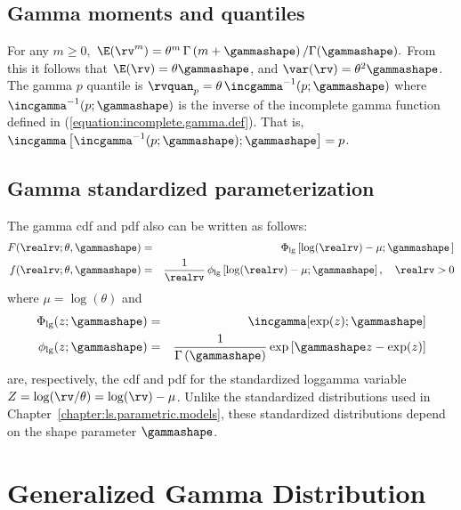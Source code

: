\subsection{Gamma moments and quantiles}
\label{section:gamma.moment.quant}
For any $m \geq 0,$ $
\E(\rv^{m})=  \theta^{m} \, \Gamma\left(
			m + \gammashape
\right) / 		 \Gamma(\gammashape).  $
From this it follows that $\E(\rv)=\theta \gammashape$, and
	$\var(\rv)=\theta^{2} \gammashape $.
The gamma $p$ quantile
is $\rvquan_{p}=\theta \,  \incgamma^{-1}(p;\gammashape)$
where $\incgamma^{-1}(p;\gammashape)$ is the
inverse of the incomplete gamma function defined in
(\ref{equation:incomplete.gamma.def}).	That is, $\incgamma
\left [\incgamma^{-1}(p;\gammashape);\gammashape \right ]=
p$.



\subsection{Gamma standardized parameterization}
\label{section:gamma.std.par}
The gamma cdf and pdf  also can be written as follows:
\begin{eqnarray*}  
 F(\realrv;\theta, \gammashape)&=&
\Phi_{\rm lg}\left [\log(\realrv)-\mu; \gammashape \,
\right ]\\
 f(\realrv;\theta, \gammashape)&=&\frac{1}{ \realrv} \, \phi_{\rm lg}
\left [ 
{\log(\realrv)-\mu}; \gammashape \right],  \quad \realrv > 0
\end{eqnarray*} 
where $\mu=\log(\theta)$ and 
\begin{eqnarray*}
\Phi_{\rm lg}(z;\gammashape)&=&\incgamma[\exp( z);\gammashape]
\\
\phi_{\rm lg}(z;\gammashape)&=&
\frac{1}{\Gamma \left(\gammashape \right )} 
\exp \left [
{\gammashape z-\exp( z)}
     \right ]
\end{eqnarray*}
are, respectively, the cdf and pdf for the
standardized loggamma variable 
$Z=\log(\rv/\theta)=\log(\rv)-\mu$.
Unlike the standardized distributions used in
Chapter~\ref{chapter:ls.parametric.models},
these standardized distributions depend on the shape
parameter $\gammashape$.

\section{Generalized Gamma Distribution}
\label{section:gng.distribution}
